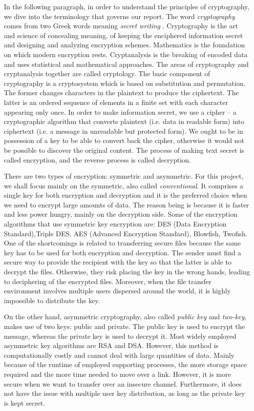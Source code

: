 In the following paragraph, in order to understand the principles of cryptography, we dive into the terminology that governs our report. The word \emph{cryptography} comes from two Greek words meaning \emph{secret writing} \cite{wikicrypto}. Cryptography is the art and science of concealing meaning, of keeping the enciphered information secret and designing and analyzing encryption schemes. Mathematics is the foundation on which modern encryption rests. Cryptanalysis is the breaking of encoded data and uses statistical and mathematical approaches. The areas of cryptography and cryptanalysis together are called cryptology. The basic component of cryptography is a cryptosystem which is based on substitution and permutation. The former changes characters in the plaintext to produce the ciphertext. The latter is an ordered sequence of elements in a finite set with each character appearing only once. In order to make information secret, we use a cipher – a cryptographic algorithm that converts plaintext (i.e. data in readable form) into ciphertext (i.e. a message in unreadable but protected form). We ought to be in possession of a key to be able to convert back the cipher, otherwise it would not be possible to discover the original content. The process of making text secret is called encryption, and the reverse process is called decryption.

There are two types of encryption: symmetric and asymmetric. For this project, we shall focus mainly on the symmetric, also called \emph{conventional}. It comprises a single key for both encryption and decryption and it is the preferred choice when we need to encrypt large amounts of data. The reason being is because it is faster and less power hungry, mainly on the decryption side. Some of the encryption algorithms that use symmetric key encryption are: DES (Data Encryption Standard),Triple DES, AES (Advanced Encryption Standard), Blowfish, Twofish. One of the shortcomings is related to transferring secure files because the same key has to be used for both encryption and decryption. The sender must find a secure way to provide the recipient with the key so that the latter is able to decrypt the files. Otherwise, they risk placing the key in the wrong hands, leading to deciphering of the encrypted files. Moreover, when the file transfer environment involves multiple users dispersed around the world, it is highly impossible to distribute the key. 

On the other hand, asymmetric cryptography, also called \emph{public key} and \emph{two-key}, makes use of two keys: public and private. The public key is used to encrypt the message, whereas the private key is used to decrypt it. Most widely employed asymmetric key algorithms are RSA and DSA. However, this method is computationally costly \cite{wikikey} and cannot deal with large quantities of data. Mainly because of the runtime of employed supporting processes, the more storage space required and the more time needed to move over a link. However, it is more secure when we want to transfer over an insecure channel. Furthermore, it does not have the issue with multiple user key distribution, as long as the private key is kept secret.

